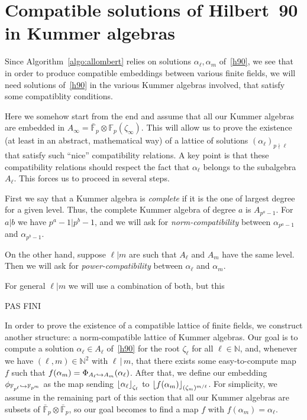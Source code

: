 \documentclass{sig-alternate}
\begin{document}
\section{Compatible solutions of Hilbert~90 in Kummer algebras}
\label{sec:lattices}

Since Algorithm~\ref{algo:allombert} relies on solutions $\alpha_\ell,\alpha_m$ of~\eqref{h90},
we see that in order to produce compatible embeddings between various finite fields,
we will need solutions of~\eqref{h90} in the various Kummer algebras involved,
that satisfy some compatiblity conditions.

Here we somehow start from the end and assume that all our Kummer algebras are
embedded in $A_\infty=\bar{\mathbb{F}}_{p}\otimes\mathbb{F}_p(\zeta_\infty)$.
This will allow us to prove the existence (at least in an abstract, mathematical way)
of a lattice of solutions $(\alpha_\ell)_{p{\nmid}\ell}$ that satisfy such ``nice''
compatibility relations. A key point is that these compatibility relations should respect
the fact that $\alpha_\ell$ belongs to the subalgebra $A_\ell$.
This forces us to proceed in several steps.

First we say that a Kummer algebra is \emph{complete} if it is the one of largest degree
for a given level. Thus, the complete Kummer algebra of degree $a$ is $A_{p^a-1}$.
For $a|b$ we have $p^a-1|p^b-1$, and we will ask for \emph{norm-compatibility}
between $\alpha_{p^a-1}$ and $\alpha_{p^b-1}$.

On the other hand, suppose $\ell|m$ are such that $A_\ell$ and $A_m$ have the same level.
Then we will ask for \emph{power-compatibility} between $\alpha_{\ell}$ and $\alpha_{m}$.

For general $\ell|m$ we will use a combination of both, but this

PAS FINI


In order to prove the existence of a compatible lattice of finite fields,
we construct another structure: a norm-compatible lattice of
Kummer algebras. Our goal is to compute a solution $\alpha_\ell\in A_\ell$
of~\eqref{h90} for the root $\zeta_\ell$ for all $\ell\in\mathbb{N}$, and,
whenever we have $(\ell, m)\in\mathbb{N}^2$ with $\ell\,|\,m$, that there exists
some easy-to-compute map $f$ such that $f(\alpha_m) =
\Phi_{A_{\ell}\hookrightarrow A_{m}}(\alpha_\ell)$. After that, we define our embedding
$\phi_{\mathbb{F}_{p^{\ell}}\hookrightarrow\mathbb{F}_{p^{m}}}$ as the map sending $\left\lfloor \alpha_\ell \right\rfloor_{\zeta_\ell}$ to
$\left\lfloor f(\alpha_m) \right\rfloor_{(\zeta_m)^{m/\ell}}$. For simplicity, we assume in the
remaining part of this section that all our Kummer algebras are subsets of
$\bar{\mathbb{F}}_{p}\otimes\bar{\mathbb{F}}_p$, so our goal becomes to find a map
$f$ with $f(\alpha_m) = \alpha_\ell$.
\end{document}
